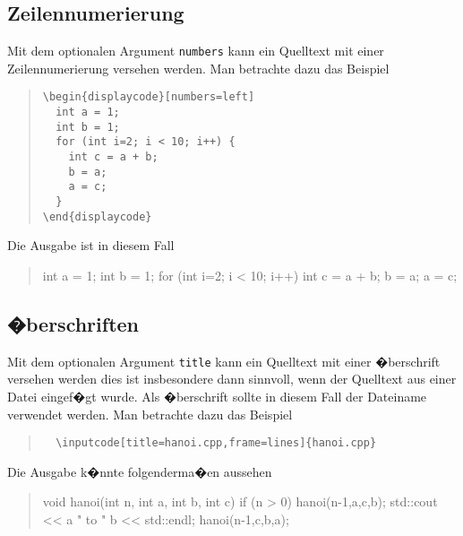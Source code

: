 \subsection{Zeilennumerierung}

Mit dem optionalen Argument \verb|numbers| kann ein Quelltext mit einer Zeilennumerierung versehen werden. Man betrachte dazu das Beispiel

\begin{quote}
\begin{verbatim}
\begin{displaycode}[numbers=left]
  int a = 1;
  int b = 1;
  for (int i=2; i < 10; i++) {
    int c = a + b;
    b = a;
    a = c;
  }
\end{displaycode}
\end{verbatim}
\end{quote}

\noindent
Die Ausgabe ist in diesem Fall

\begin{quote}
\begin{displaycode}[numbers=left]
  int a = 1;
  int b = 1;
  for (int i=2; i < 10; i++) {
    int c = a + b;
    b = a;
    a = c;
  }
\end{displaycode}
\end{quote}




\subsection{�berschriften}

Mit dem optionalen Argument \verb|title| kann ein Quelltext mit einer �berschrift versehen werden dies ist insbesondere dann sinnvoll, wenn der Quelltext aus einer Datei eingef�gt wurde. Als �berschrift sollte in diesem Fall der Dateiname verwendet werden. Man betrachte dazu das Beispiel

\begin{quote}
\begin{verbatim}
  \inputcode[title=hanoi.cpp,frame=lines]{hanoi.cpp}
\end{verbatim}
\end{quote}

\noindent
Die Ausgabe k�nnte folgenderma�en aussehen

\begin{quote}
\begin{displaycode}[title=hanoi.cpp,frame=lines]
  void hanoi(int n, int a, int b, int c) {
    if (n > 0) {
      hanoi(n-1,a,c,b);
      std::cout << a " to " b << std::endl;
      hanoi(n-1,c,b,a);
    }
  }
\end{displaycode}
\end{quote}
